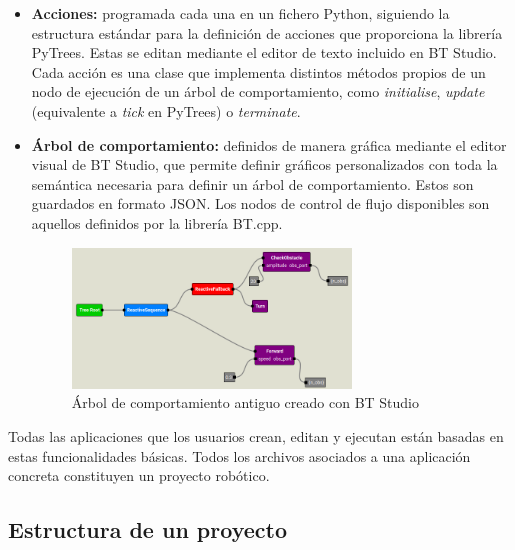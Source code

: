 \begin{itemize}
    \item \textbf{Acciones:} programada cada una en un fichero Python, siguiendo la estructura estándar para la definición de acciones que proporciona la librería PyTrees. Estas se editan mediante el editor de texto incluido en BT Studio. Cada acción es una clase que implementa distintos métodos propios de un nodo de ejecución de un árbol de comportamiento, como \textit{initialise}, \textit{update} (equivalente a \textit{tick} en PyTrees) o \textit{terminate}. 
    

    \item \textbf{Árbol de comportamiento:} definidos de manera gráfica mediante el editor visual de BT Studio, que permite definir gráficos personalizados con toda la semántica necesaria para definir un árbol de comportamiento. Estos son guardados en formato JSON. Los nodos de control de flujo disponibles son aquellos definidos por la librería BT.cpp. 
    \begin{figure}[H]
        \centering
        \includegraphics[width=0.7\textwidth]{figures/bt-studio/tree_example.png}
        \caption{Árbol de comportamiento antiguo creado con BT Studio}
        \label{fig:ejemplo}
    \end{figure}
    
\end{itemize}

Todas las aplicaciones que los usuarios crean, editan y ejecutan están basadas en estas funcionalidades básicas. Todos los archivos asociados a una aplicación concreta constituyen un proyecto robótico. 

\subsection{Estructura de un proyecto}\label{sec:bt-struct-old}

